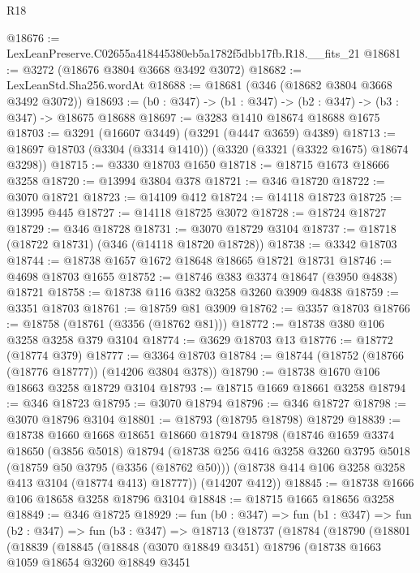 \begin{lexlean}{R18}
\begin{coremodule}
@18676 := LexLeanPreserve.C02655a418445380eb5a1782f5dbb17fb.R18.__fits_21
@18681 := @3272 (@18676 @3804 @3668 @3492 @3072)
@18682 := LexLeanStd.Sha256.wordAt
@18688 := @18681 (@346 (@18682 @3804 @3668 @3492 @3072))
@18693 := (b0 : @347) -> (b1 : @347) -> (b2 : @347) -> (b3 : @347) -> @18675 @18688
@18697 := @3283 @1410 @18674 @18688 @1675
@18703 := @3291 (@16607 @3449) (@3291 (@4447 @3659) @4389)
@18713 := @18697 @18703 (@3304 (@3314 @1410)) (@3320 (@3321 (@3322 @1675) @18674 @3298))
@18715 := @3330 @18703 @1650
@18718 := @18715 @1673 @18666 @3258
@18720 := @13994 @3804 @378
@18721 := @346 @18720
@18722 := @3070 @18721
@18723 := @14109 @412
@18724 := @14118 @18723
@18725 := @13995 @445
@18727 := @14118 @18725 @3072
@18728 := @18724 @18727
@18729 := @346 @18728
@18731 := @3070 @18729 @3104
@18737 := @18718 (@18722 @18731) (@346 (@14118 @18720 @18728))
@18738 := @3342 @18703
@18744 := @18738 @1657 @1672 @18648 @18665 @18721 @18731
@18746 := @4698 @18703 @1655
@18752 := @18746 @383 @3374 @18647 (@3950 @4838) @18721
@18758 := @18738 @116 @382 @3258 @3260 @3909 @4838
@18759 := @3351 @18703
@18761 := @18759 @81 @3909
@18762 := @3357 @18703
@18766 := @18758 (@18761 (@3356 (@18762 @81)))
@18772 := @18738 @380 @106 @3258 @3258 @379 @3104
@18774 := @3629 @18703 @13
@18776 := @18772 (@18774 @379)
@18777 := @3364 @18703
@18784 := @18744 (@18752 (@18766 (@18776 @18777)) (@14206 @3804 @378))
@18790 := @18738 @1670 @106 @18663 @3258 @18729 @3104
@18793 := @18715 @1669 @18661 @3258
@18794 := @346 @18723
@18795 := @3070 @18794
@18796 := @346 @18727
@18798 := @3070 @18796 @3104
@18801 := @18793 (@18795 @18798) @18729
@18839 := @18738
    @1660
    @1668
    @18651
    @18660
    @18794
    @18798
    (@18746
      @1659
      @3374
      @18650
      (@3856 @5018)
      @18794
      (@18738
        @256
        @416
        @3258
        @3260
        @3795
        @5018
        (@18759 @50 @3795 (@3356 (@18762 @50)))
        (@18738 @414 @106 @3258 @3258 @413 @3104 (@18774 @413) @18777))
      (@14207 @412))
@18845 := @18738 @1666 @106 @18658 @3258 @18796 @3104
@18848 := @18715 @1665 @18656 @3258
@18849 := @346 @18725
@18929 := fun (b0 : @347) =>
  fun (b1 : @347) =>
  fun (b2 : @347) =>
  fun (b3 : @347) =>
  @18713
    (@18737
      (@18784
        (@18790
          (@18801
            (@18839
              (@18845
                (@18848
                  (@3070 @18849 @3451)
                  @18796
                  (@18738
                    @1663
                    @1059
                    @18654
                    @3260
                    @18849
                    @3451

\end{coremodule}
\end{lexlean}

